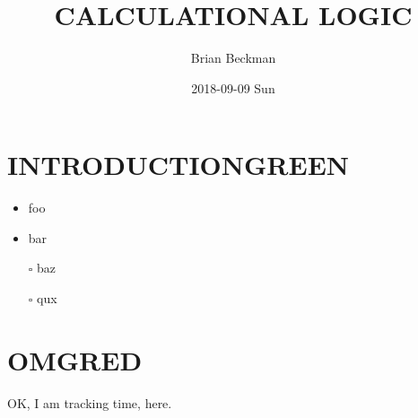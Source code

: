 \documentclass[10pt,oneside,x11names]{article}
\author{Brian Beckman}
\date{2018-09-09 Sun}
\title{CALCULATIONAL LOGIC}
\begin{document}
\maketitle

\section{INTRODUCTION\hfill{}\textsc{GREEN}}
\label{sec:org61b1517}
\begin{itemize}
\item foo
\item bar
\item[{$\square$}] baz
\item[{$\square$}] qux
\end{itemize}

\section{OMG\hfill{}\textsc{RED}}
\label{sec:orga106af8}
OK, I am tracking time, here.
\end{document}
